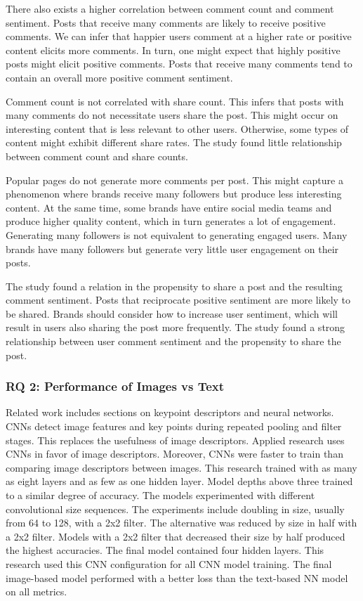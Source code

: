 \documentclass[mksc,blindrev]{informs3} %
\begin{document}
There also exists a higher correlation between comment count and comment sentiment. Posts that receive many comments are likely to receive positive comments. We can infer that happier users comment at a higher rate or positive content elicits more comments. In turn, one might expect that highly positive posts might elicit positive comments. Posts that receive many comments tend to contain an overall more positive comment sentiment.

Comment count is not correlated with share count. This infers that posts with many comments do not necessitate users share the post. This might occur on interesting content that is less relevant to other users. Otherwise, some types of content might exhibit different share rates. The study found little relationship between comment count and share counts.

Popular pages do not generate more comments per post. This might capture a phenomenon where brands receive many followers but produce less interesting content. At the same time, some brands have entire social media teams and produce higher quality content, which in turn generates a lot of engagement. Generating many followers is not equivalent to generating engaged users. Many brands have many followers but generate very little user engagement on their posts.

The study found a relation in the propensity to share a post and the resulting comment sentiment. Posts that reciprocate positive sentiment are more likely to be shared. Brands should consider how to increase user sentiment, which will result in users also sharing the post more frequently. The study found a strong relationship between user comment sentiment and the propensity to share the post.

\subsubsection{RQ 2: Performance of Images vs Text}

Related work includes sections on keypoint descriptors and neural networks. CNNs detect image features and key points during repeated pooling and filter stages.  This replaces the usefulness of image descriptors. Applied research uses CNNs in favor of image descriptors. Moreover, CNNs were faster to train than comparing image descriptors between images. This research trained with as many as eight layers and as few as one hidden layer. Model depths above three trained to a similar degree of accuracy. The models experimented with different convolutional size sequences. The experiments include doubling in size, usually from 64 to 128, with a 2x2 filter. The alternative was reduced by size in half with a 2x2 filter.  Models with a 2x2 filter that decreased their size by half produced the highest accuracies. The final model contained four hidden layers. This research used this CNN configuration for all CNN model training. The final image-based model performed with a better loss than the text-based NN model on all metrics.   
\end{document}
